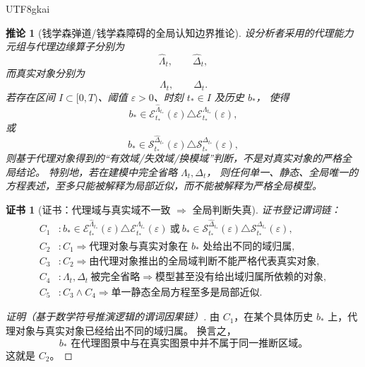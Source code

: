 \documentclass[12pt]{article}
\newtheorem{corollary}{推论}[section]
\newtheorem{Certificate}{证书}[section]
\begin{document}
\begin{CJK*}{UTF8}{gkai}
\begin{corollary}[钱学森弹道/钱学森障碍的全局认知边界推论]
\label{cor:tex1-global-cognition}
设分析者采用的代理能力元组与代理边缘算子分别为
\[
  \widehat\Lambda_t,
  \qquad
  \widehat\Delta_t,
\]
而真实对象分别为
\[
  \Lambda_t,
  \qquad
  \Delta_t.
\]
若存在区间 $I\subset[0,T)$、阈值 $\varepsilon>0$、时刻 $t_\ast\in I$ 及历史 $b_\ast$，
使得
\[
  b_\ast\in
  \mathcal E_{t_\ast}^{\widehat\Lambda_{t_\ast}}(\varepsilon)
  \triangle
  \mathcal E_{t_\ast}^{\Lambda_{t_\ast}}(\varepsilon),
\]
或
\[
  b_\ast\in
  \mathcal S_{t_\ast}^{\widehat\Delta_{t_\ast}}(\varepsilon)
  \triangle
  \mathcal S_{t_\ast}^{\Delta_{t_\ast}}(\varepsilon),
\]
则基于代理对象得到的“有效域/失效域/换模域”判断，不是对真实对象的严格全局结论。
特别地，若在建模中完全省略 $\Lambda_t,\Delta_t$，
则任何单一、静态、全局唯一的方程表述，至多只能被解释为局部近似，而不能被解释为严格全局模型。
\end{corollary}

\begin{Certificate}[证书：代理域与真实域不一致 $\Rightarrow$ 全局判断失真]
\label{cert:tex1-global-cognition}
证书登记谓词链：
\[
\begin{aligned}
  C_1 &: b_\ast\in
        \mathcal E_{t_\ast}^{\widehat\Lambda_{t_\ast}}(\varepsilon)
        \triangle
        \mathcal E_{t_\ast}^{\Lambda_{t_\ast}}(\varepsilon)
        \ \text{或}\
        b_\ast\in
        \mathcal S_{t_\ast}^{\widehat\Delta_{t_\ast}}(\varepsilon)
        \triangle
        \mathcal S_{t_\ast}^{\Delta_{t_\ast}}(\varepsilon),\\
  C_2 &: C_1\Rightarrow
        \text{代理对象与真实对象在 }b_\ast\text{ 处给出不同的域归属},\\
  C_3 &: C_2\Rightarrow
        \text{由代理对象推出的全局域判断不能严格代表真实对象},\\
  C_4 &: \Lambda_t,\Delta_t\ \text{被完全省略}
        \Rightarrow
        \text{模型甚至没有给出域归属所依赖的对象},\\
  C_5 &: C_3\wedge C_4
        \Rightarrow
        \text{单一静态全局方程至多是局部近似}.
\end{aligned}
\]
\end{Certificate}

\begin{proof}[证明（基于数学符号推演逻辑的谓词因果链）]
由 \(C_1\)，在某个具体历史 $b_\ast$ 上，代理对象与真实对象已经给出不同的域归属。
换言之，
\[
  b_\ast
  \text{ 在代理图景中与在真实图景中并不属于同一推断区域。}
\]
这就是 \(C_2\)。


\end{proof}
\end{CJK*}
\end{document}
